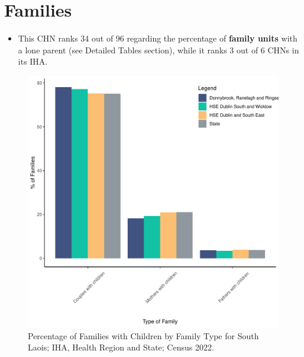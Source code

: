 \documentclass{article}
\begin{document}
\section{Families}\label{sect:Fam}
\begin{itemize}
\item This CHN ranks  34 out of 96 regarding the percentage of \textbf{family units} with a lone parent (see Detailed Tables section), while it ranks   3 out of 6 CHNs in its IHA.
\end{itemize}
\begin{figure}[H]
	\centering
	\includegraphics[width = 150mm]{../figures/FamED.pdf}
	\caption{Percentage of Families with Children by Family Type for South Laois; IHA, Health Region and State; Census 2022.}
	\label{fig:vbnv}
	\end{figure}
	
\end{document}
